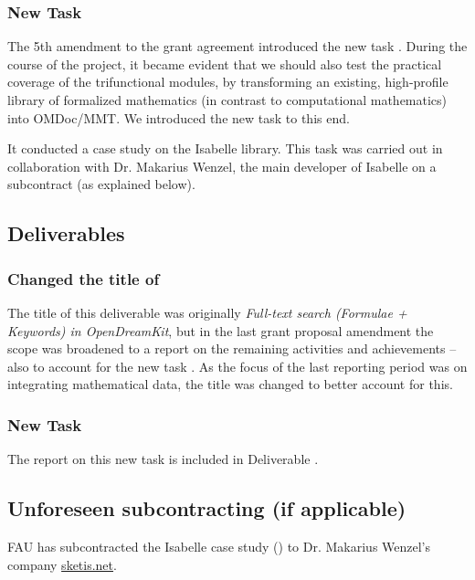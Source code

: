 \subsubsection{New Task }

The 5th amendment to the grant agreement introduced the new task .
During the course of the project, it became evident that we should also test the practical coverage of the trifunctional modules, by
transforming an existing, high-profile library of formalized mathematics (in contrast to computational mathematics) into OMDoc/MMT.
We introduced the new task to this end.

It conducted a case study on the Isabelle library.
This task was carried out in collaboration with Dr. Makarius Wenzel, the main developer of Isabelle on a subcontract (as explained below).

\subsection{Deliverables}

\subsubsection{Changed the title of }
The title of this deliverable was originally \emph{Full-text search
  (Formulae + Keywords) in OpenDreamKit}, but in the last grant
proposal amendment the scope was broadened to a report on the
remaining  activities and achievements -- also to
account for the new task . As the focus of
the last reporting period was on integrating mathematical data, the title was changed to better account for this.

\subsubsection{New Task }
The report on this new task is included in Deliverable .

\subsection{Unforeseen subcontracting (if applicable)}
FAU has subcontracted the Isabelle case study () to Dr. Makarius Wenzel's company \url{sketis.net}.

